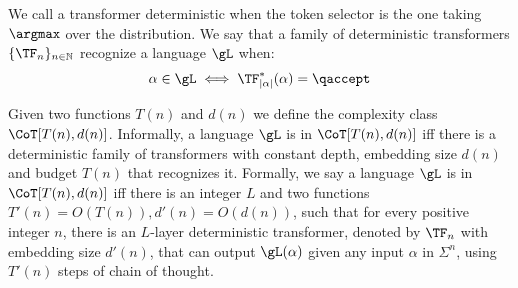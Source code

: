 
We call a transformer deterministic when the token selector is the one taking $\argmax$ over the distribution.
We say that a family of deterministic transformers $\{\TF_n\}_{n \in \mathbb{N}}$ recognize a language $\gL$ when: 
\[
\alpha \in \gL \iff \TF_{|\alpha|}^*(\alpha) = \qaccept
\]

Given two functions $T(n)$ and $d(n)$ we define the complexity class $\CoT[T(n), d(n)]$.
Informally, a language $\gL$ is in $\CoT[T(n), d(n)]$ iff there is a deterministic family of transformers with constant depth, embedding size $d(n)$ and budget $T(n)$ that recognizes it.
Formally, we say a language  $\gL$ is in $\CoT[T(n), d(n)]$ iff there is an integer $L$ and two functions $T'(n) = O(T(n)), d'(n) = O(d(n))$, such that for every positive integer $n$, there is an $L$-layer deterministic transformer, denoted by $\TF_n$ with embedding size $d'(n)$, that can output $\gL(\alpha)$ given any input $\alpha$ in $\Sigma^n$, using $T'(n)$ steps of chain of thought.


